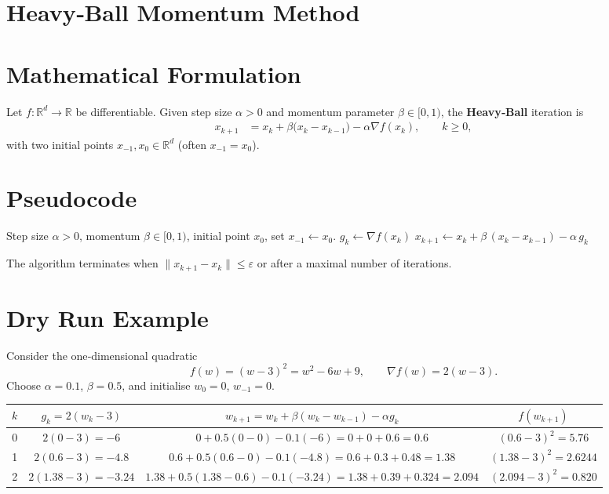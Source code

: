 \documentclass{article}
\begin{document}
\section*{Heavy‑Ball Momentum Method}

\section*{Mathematical Formulation}
Let $f:\mathbb{R}^{d}\to\mathbb{R}$ be differentiable.  
Given step size $\alpha>0$ and momentum parameter $\beta\in[0,1)$,
the \textbf{Heavy‑Ball} iteration is
\[
\boxed{
\begin{aligned}
x_{k+1}&=x_{k}+\beta\bigl(x_{k}-x_{k-1}\bigr)-\alpha\nabla f(x_{k}),\qquad k\ge 0,
\end{aligned}}
\]
with two initial points $x_{-1},x_{0}\in\mathbb{R}^{d}$ (often $x_{-1}=x_{0}$).

\section*{Pseudocode}
\begin{algorithm}[H]
\caption{Heavy‑Ball Momentum}
\begin{algorithmic}[1]
\Require Step size $\alpha>0$, momentum $\beta\in[0,1)$, initial point $x_{0}$, set $x_{-1}\gets x_{0}$.
    \State $g_{k}\gets\nabla f(x_{k})$ 
    \State $x_{k+1}\gets x_{k}+\beta\,(x_{k}-x_{k-1})-\alpha\,g_{k}$ 
\EndFor
\end{algorithmic}
\end{algorithm}

The algorithm terminates when $\|x_{k+1}-x_{k}\|\le\varepsilon$ or after a maximal number of iterations.

\section*{Dry Run Example}
Consider the one‑dimensional quadratic
\[
f(w)=(w-3)^{2}=w^{2}-6w+9,
\qquad \nabla f(w)=2(w-3).
\]
Choose $\alpha=0.1$, $\beta=0.5$, and initialise $w_{0}=0$, $w_{-1}=0$.

\begin{tabular}{c|c|c|c}
$k$ & $g_{k}=2(w_{k}-3)$ & $w_{k+1}=w_{k}+\beta(w_{k}-w_{k-1})-\alpha g_{k}$ & $f(w_{k+1})$\\ \hline
0 & $2(0-3)=-6$ & $0+0.5(0-0)-0.1(-6)=0+0+0.6=0.6$ & $(0.6-3)^{2}=5.76$\\
1 & $2(0.6-3)=-4.8$ & $0.6+0.5(0.6-0)-0.1(-4.8)=0.6+0.3+0.48=1.38$ & $(1.38-3)^{2}=2.6244$\\
2 & $2(1.38-3)=-3.24$ & $1.38+0.5(1.38-0.6)-0.1(-3.24)=1.38+0.39+0.324=2.094$ & $(2.094-3)^{2}=0.820$\\
\end{tabular}
\end{document}

